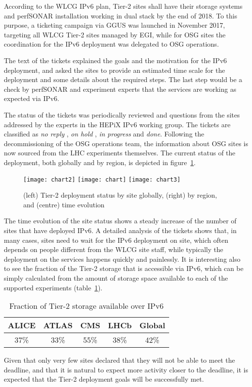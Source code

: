 According to the WLCG IPv6 plan, Tier-2 sites shall have
their storage systems and perfSONAR installation
working in dual stack by the end of 2018. To this purpose, a ticketing
campaign via GGUS was launched in November 2017, targeting all WLCG Tier-2
sites managed by EGI, while for OSG sites the coordination for the
IPv6 deployment was delegated to OSG operations.

The text of the tickets explained the goals and the motivation for the
IPv6 deployment, and asked the sites to provide an estimated time
scale for the deployment and some details about the required
steps. The last step would be a check by perfSONAR and experiment
experts that the services are working as expected via IPv6.

The status of the tickets was periodically reviewed and questions from
the sites addressed by the experts in the HEPiX IPv6 working
group. The tickets are classified as {\it no reply} 
, {\it on hold} 
, {\it in progress} 
and {\it done}.
Following the decommissioning of the OSG operations team, the
information about OSG sites is now sourced from the LHC experiments
themselves. The current status of the deployment, both globally and by
region, is depicted in figure~\ref{fig:t2depl}.
\begin{figure}[t]
\centering
\texttt{[image: chart2]}
\texttt{[image: chart]}
\texttt{[image: chart3]}
\caption{(left) Tier-2 deployment status by site globally, (right) by region, and (centre) time evolution}
\label{fig:t2depl}
\end{figure}

The time evolution of the site status shows a steady increase of the
number of sites that have deployed IPv6. A detailed analysis of the
tickets shows that, in many cases, sites need to wait for the IPv6
deployment on site, which often depends on people different from the
WLCG site staff, while typically the deployment on the services
happens quickly and painlessly. It is interesting also to see the
fraction of the Tier-2 storage that is accessible via IPv6, which can
be simply calculated from the amount of storage space available to
each of the supported experiments (table~\ref{tab:t2stor}).
\begin{table}[h]
\centering
\caption{Fraction of Tier-2 storage available over IPv6}
\label{tab:t2stor}
\begin{tabular}{ccccc}
\hline
ALICE & ATLAS & CMS & LHCb & Global \\\hline
37\% & 33\% & 55\% & 38\% & 42\% \\\hline
\end{tabular}
\end{table}
Given that only very few sites declared that they will not be able to
meet the deadline, and that it is natural to expect more activity closer to
the deadline, it is expected that the Tier-2 deployment
goals will be successfully met.
